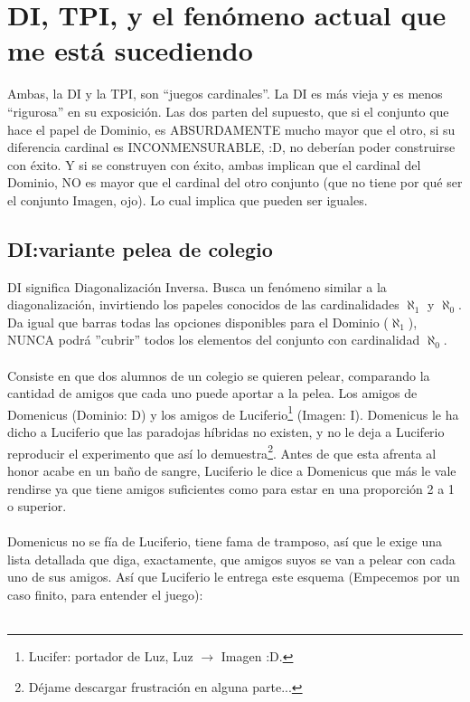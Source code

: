 \chapter{DI, TPI, y el fenómeno actual que me está sucediendo}

	\noindent
	Ambas, la DI y la TPI, son ``juegos cardinales''. La DI es más vieja y es menos ``rigurosa'' en su exposición. Las dos parten del supuesto, que si el conjunto que hace el papel de Dominio, es ABSURDAMENTE mucho mayor que el otro, si su diferencia cardinal es INCONMENSURABLE, :D, no deberían poder construirse con éxito. Y si se construyen con éxito, ambas implican que el cardinal del Dominio, NO es mayor que el cardinal del otro conjunto (que no tiene por qué ser el conjunto Imagen, ojo). Lo cual implica que pueden ser iguales.

	\section{DI:variante pelea de colegio}
	
	\noindent
	DI significa Diagonalización Inversa. Busca un fenómeno similar a la diagonalización, invirtiendo los papeles conocidos de las cardinalidades $\aleph_{1}$ y $\aleph_{0}$. Da igual que barras todas las opciones disponibles para el Dominio ($\aleph_{1}$), NUNCA podrá ''cubrir'' todos los elementos del conjunto con cardinalidad $\aleph_{0}$.
	\\\\
	
	\noindent
	Consiste en que dos alumnos de un colegio se quieren pelear, comparando la cantidad de amigos que cada uno puede aportar a la pelea. Los amigos de Domenicus (Dominio: D) y los amigos de Luciferio\footnote{Lucifer: portador de Luz, Luz $\rightarrow$ Imagen :D.} (Imagen: I). Domenicus le ha dicho a Luciferio que las paradojas híbridas no existen, y no le deja a Luciferio reproducir el experimento que así lo demuestra\footnote{Déjame descargar frustración en alguna parte...}. Antes de que esta afrenta al honor acabe en un baño de sangre, Luciferio le dice a Domenicus que más le vale rendirse ya que tiene amigos suficientes como para estar en una proporción 2 a 1 o superior.
	\\\\
	
	\noindent
	Domenicus no se fía de Luciferio, tiene fama de tramposo, así que le exige una lista detallada que diga, exactamente, que amigos suyos se van a pelear con cada uno de sus amigos. Así que Luciferio le entrega este esquema (Empecemos por un caso finito, para entender el juego):
	\\\\
	
